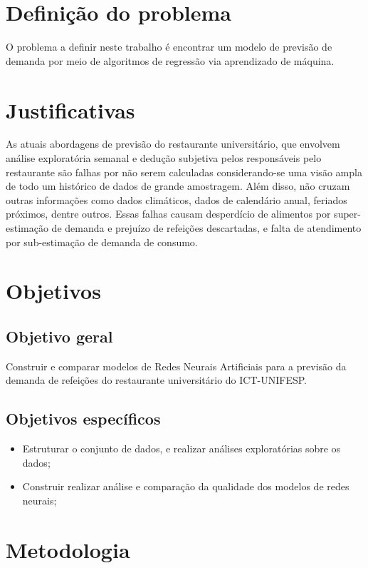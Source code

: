 \documentclass[	12pt, Times, openright, twoside, a4paper, english, brazil]{abntex2}
\begin{document}
      \section{Definição do problema}
        O problema a definir neste trabalho é encontrar um modelo de previsão de demanda por meio de algoritmos de regressão via aprendizado de máquina.

      \section{Justificativas}
        As atuais abordagens de previsão do restaurante universitário, que envolvem análise exploratória semanal e dedução subjetiva pelos responsáveis pelo restaurante são falhas por não serem calculadas considerando-se uma visão ampla de todo um histórico de dados de grande amostragem. Além disso, não cruzam outras informações como dados climáticos, dados de calendário anual, feriados próximos, dentre outros. Essas falhas causam desperdício de alimentos por super-estimação de demanda e prejuízo de refeições descartadas, e falta de atendimento por sub-estimação de demanda de consumo.

      \section{Objetivos}
        \subsection{Objetivo geral}
          Construir e comparar modelos de Redes Neurais Artificiais para a previsão da demanda de
          refeições do restaurante universitário do ICT-UNIFESP.
        
        \subsection{Objetivos específicos}
          \begin{itemize}
          \item Estruturar o conjunto de dados, e realizar análises exploratórias sobre os dados; 
          \item Construir realizar análise e comparação da qualidade dos modelos de redes neurais; %
          \end{itemize}
      \section{Metodologia}
\end{document}
